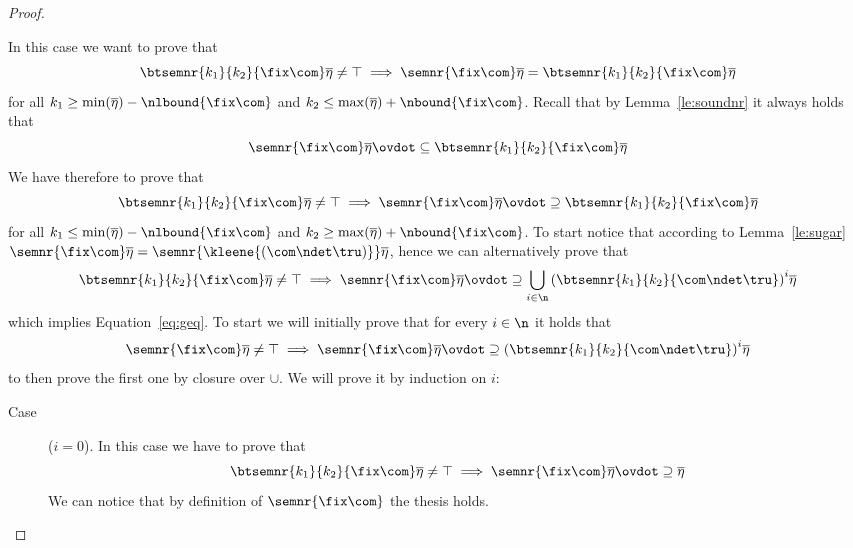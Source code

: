 \begin{proof}
\begin{inductive}
    \case{\(\fix\com\)} In this case we want to prove that
    \begin{equation*}
      \btsemnr{k_1}{k_2}{\fix\com}\overline\eta \neq \top
      \implies
      \semnr{\fix\com}\overline\eta = \btsemnr{k_1}{k_2}{\fix\com}\overline\eta
    \end{equation*}
    for all \(k_1 \geq \min(\overline\eta) - \nlbound{\fix\com}\) and
    \(k_2 \leq \max(\overline\eta) + \nbound{\fix\com}\). Recall that by
    Lemma~\ref{le:soundnr} it always holds that
    \begin{equation*}
      \semnr{\fix\com}\overline\eta \ovdot\subseteq \btsemnr{k_1}{k_2}{\fix\com}\overline\eta
    \end{equation*}
    We have therefore to prove that 
    \begin{equation}\label{eq:geq}
      \btsemnr{k_1}{k_2}{\fix\com}\overline\eta \neq \top
      \implies
      \semnr{\fix\com}\overline\eta \ovdot\supseteq \btsemnr{k_1}{k_2}{\fix\com}\overline\eta
    \end{equation}
    for all \(k_1 \leq \min(\overline\eta) - \nlbound{\fix\com}\) and
    \(k_2 \geq \max(\overline\eta) + \nbound{\fix\com}\). To start notice that
    according to Lemma~\ref{le:sugar}
    \(\semnr{\fix\com}\overline\eta = \semnr{\kleene{(\com\ndet\tru)}}\overline\eta\),
    hence we can alternatively prove that
    \begin{equation*}
      \btsemnr{k_1}{k_2}{\fix\com}\overline\eta\neq \top
      \implies
      \semnr{\fix\com}\overline\eta
      \ovdot\supseteq
      \bigcup_{i\in\n} {\left(\btsemnr{k_1}{k_2}{\com \ndet \tru}\right)}^i\overline\eta
    \end{equation*}
    which implies Equation~\ref{eq:geq}. To start we will initially
    prove that for every \(i\in\n\) it holds that
    \begin{equation*}
      \semnr{\fix\com}\overline\eta \neq \top
      \implies
      \semnr{\fix\com}\overline\eta \ovdot\supseteq
      {\left(\btsemnr{k_1}{k_2}{\com \ndet \tru}\right)}^i\overline\eta
    \end{equation*}
    to then prove the first one by closure over \(\cup\). We will
    prove it by induction on \(i\):
    \begin{description}
      
    \item[Case] (\(i=0\)). In this case we have to prove that
      \begin{equation*}
        \btsemnr{k_1}{k_2}{\fix\com}\overline\eta \neq \top
        \implies
        \semnr{\fix\com}\overline\eta \ovdot\supseteq \overline\eta
      \end{equation*}
      We can notice that by definition of \(\semnr{\fix\com}\) the
      thesis holds.
      

\end{description}
\end{inductive}
\end{proof}
